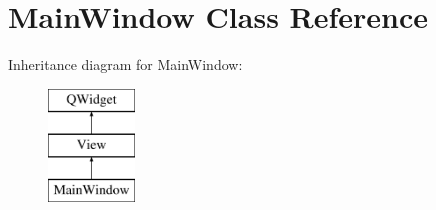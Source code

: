 \hypertarget{class_main_window}{}\section{Main\+Window Class Reference}
\label{class_main_window}
Inheritance diagram for Main\+Window\+:\begin{figure}[H]
\begin{center}
\leavevmode
\includegraphics[height=3.000000cm]{class_main_window}
\end{center}
\end{figure}
